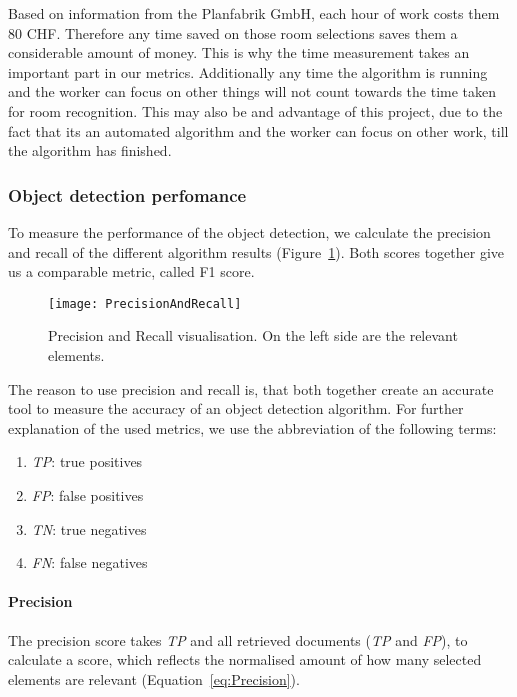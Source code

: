 Based on information from the Planfabrik GmbH, each hour of work costs them 80 CHF. Therefore any time saved on those room selections saves them a considerable amount of money. This is why the time measurement takes an important part in our metrics. Additionally any time the algorithm is running and the worker can focus on other things will not count towards the time taken for room recognition. This may also be and advantage of this project, due to the fact that its an automated algorithm and the worker can focus on other work, till the algorithm has finished.

\subsubsection{Object detection perfomance}
\label{sub:ObjectDetectionPerfomance}

To measure the performance of the object detection, we calculate the precision and recall of the different algorithm results (Figure~\ref{fig:PrecisionAndRecall}). Both scores together give us a comparable metric, called F1 score.

\begin{figure}[H]
	\centering
	\texttt{[image: PrecisionAndRecall]}
	\caption{Precision and Recall visualisation. On the left side are the relevant elements.}
	\label{fig:PrecisionAndRecall}
\end{figure}

The reason to use precision and recall is, that both together create an accurate tool to measure the accuracy of an object detection algorithm. For further explanation of the used metrics, we use the abbreviation of the following terms:

\begin{enumerate}[label=]
    \item \textit{TP}: true positives
    \item \textit{FP}: false positives
    \item \textit{TN}: true negatives
    \item \textit{FN}: false negatives
\end{enumerate}

\paragraph{Precision}
\label{sub:Precision}

The precision score takes \textit{TP} and all retrieved documents (\textit{TP} and \textit{FP}), to calculate a score, which reflects the normalised amount of how many selected elements are relevant (Equation~\ref{eq:Precision}).

